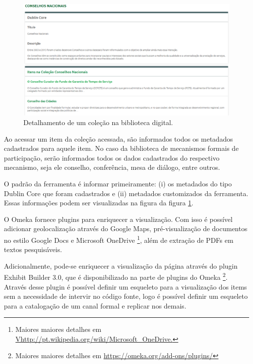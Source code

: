 \graphicspath{{figuras/prototipo/}}
\begin{figure}[H]
\centering
\includegraphics[width=1.0\textwidth]{descricao-colecao}
\caption{Detalhamento de um coleção na biblioteca digital.}
\label{fig:descricao_prototipo}
\end{figure}

Ao acessar um item da coleção acessada, são informados todos os metadados cadastrados para aquele item. No caso da biblioteca de mecanismos formais de participação, serão informados todos os dados cadastrados do respectivo mecanismo, seja ele conselho, conferência, mesa de diálogo, entre outros. 

O padrão da ferramenta é informar primeiramente: (i) os metadados do tipo Dublin Core que foram cadastrados e (ii) metadados customizados da ferramenta. Essas informações podem ser visualizadas na figura da figura \ref{fig:descricao_prototipo}.

O Omeka fornece plugins para enriquecer a visualização. Com isso é possível adicionar geolocalização através do Google Maps, pré-visualização de documentos no estilo Google Docs e Microsoft OneDrive \footnote{Maiores maiores detalhes em \url{Vhttp://pt.wikipedia.org/wiki/Microsoft\_OneDrive.}}, além de extração de PDFs em textos pesquisáveis.

Adicionalmente, pode-se enriquecer a visualização da página através do plugin Exhibit Builder 3.0, que é disponibilizado na parte de plugins do Omeka \footnote{Maiores maiores detalhes em \url{https://omeka.org/add-ons/plugins/}}. Através desse plugin é possível definir um esqueleto para a visualização dos items sem a necessidade de intervir no código fonte, logo é possível definir um esqueleto para a catalogação de um canal formal e replicar nos demais.

